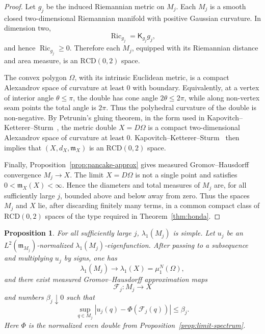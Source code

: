 \documentclass[11pt]{amsart}
\newtheorem{proposition}[theorem]{Proposition}
\numberwithin{equation}{section}
\newcommand{\Om}{\Omega}
\newcommand{\mm}{\mathfrak m}
\newcommand{\RCD}{\mathrm{RCD}}
\begin{document}
\begin{proof}
Let \(g_j\) be the induced Riemannian metric on \(M_j\).  Each \(M_j\) is a
smooth closed two-dimensional Riemannian manifold with positive Gaussian
curvature.  In dimension two,
\[
\operatorname{Ric}_{g_j}=\mathsf K_{g_j}g_j ,
\]
and hence \(\operatorname{Ric}_{g_j}\ge0\).  Therefore each \(M_j\), equipped with
its Riemannian distance and area measure, is an \(\RCD(0,2)\) space.

The convex polygon \(\Om\), with its intrinsic Euclidean metric, is a compact
Alexandrov space of curvature at least \(0\) with boundary.  Equivalently, at a
vertex of interior angle \(\theta\le\pi\), the double has cone angle
\(2\theta\le2\pi\), while along non-vertex seam points the total angle is
\(2\pi\).  Thus the polyhedral curvature of the double is non-negative.  By
Petrunin's gluing theorem, in the form used in
Kapovitch--Ketterer--Sturm~\cite[Theorem~2.13]{KKS}, the metric double
\(X=D\Om\) is a compact two-dimensional Alexandrov space of curvature at least
\(0\).  Kapovitch--Ketterer--Sturm~\cite[Corollary~2.10]{KKS} then implies that
\((X,d_X,\mm_X)\) is an \(\RCD(0,2)\) space.

Finally, Proposition~\ref{prop:pancake-approx} gives measured
Gromov--Hausdorff convergence \(M_j\to X\).  The limit \(X=D\Om\) is not a
single point and satisfies \(0<\mm_X(X)<\infty\).  Hence the diameters and total
measures of \(M_j\) are, for all sufficiently large \(j\), bounded above and
below away from zero.  Thus the spaces \(M_j\) and \(X\) lie, after discarding
finitely many terms, in a common compact class of \(\RCD(0,2)\) spaces of the
type required in Theorem~\ref{thm:honda}.
\end{proof}

\begin{proposition}\label{prop:eigenfunction-convergence}
For all sufficiently large \(j\), \(\lambda_1(M_j)\) is simple.  Let \(u_j\) be an
\(L^2(\mm_{M_j})\)-normalized \(\lambda_1(M_j)\)-eigenfunction.  After passing to
a subsequence and multiplying \(u_j\) by signs, one has
\begin{equation}\label{eq:lambda1-convergence-to-limit}
\lambda_1(M_j)\to\lambda_1(X)=\mu_1^N(\Om),
\end{equation}
and there exist measured Gromov--Hausdorff approximation maps
\[
\mathcal F_j:M_j\to X
\]
and numbers \(\beta_j\downarrow0\) such that
\begin{equation}\label{eq:eigenfunction-uniform-convergence-to-Phi}
\sup_{q\in M_j}
\left|
u_j(q)-\Phi(\mathcal F_j(q))
\right|
\le \beta_j .
\end{equation}
Here \(\Phi\) is the normalized even double from
Proposition~\ref{prop:limit-spectrum}.
\end{proposition}
\end{document}
